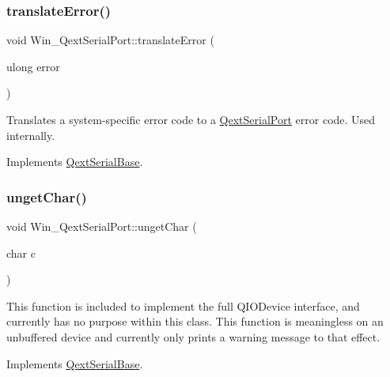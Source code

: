 \mbox{\label{class_win___qext_serial_port_abf215448e265ab0bc8d06cb05e0f7778}} 
\subsubsection{\texorpdfstring{translate\+Error()}{translateError()}}
{\footnotesize\ttfamily void Win\+\_\+\+Qext\+Serial\+Port\+::translate\+Error (\begin{DoxyParamCaption}\item[{ulong}]{error }\end{DoxyParamCaption})\hspace{0.3cm}{\ttfamily [virtual]}}

Translates a system-\/specific error code to a \mbox{\hyperlink{class_qext_serial_port}{Qext\+Serial\+Port}} error code. Used internally. 

Implements \mbox{\hyperlink{class_qext_serial_base}{Qext\+Serial\+Base}}.

\mbox{\label{class_win___qext_serial_port_a02ce5d55c51cca1862f2154f680d6e3c}} 
\subsubsection{\texorpdfstring{unget\+Char()}{ungetChar()}}
{\footnotesize\ttfamily void Win\+\_\+\+Qext\+Serial\+Port\+::unget\+Char (\begin{DoxyParamCaption}\item[{char}]{c }\end{DoxyParamCaption})\hspace{0.3cm}{\ttfamily [virtual]}}

This function is included to implement the full Q\+I\+O\+Device interface, and currently has no purpose within this class. This function is meaningless on an unbuffered device and currently only prints a warning message to that effect. 

Implements \mbox{\hyperlink{class_qext_serial_base}{Qext\+Serial\+Base}}.

